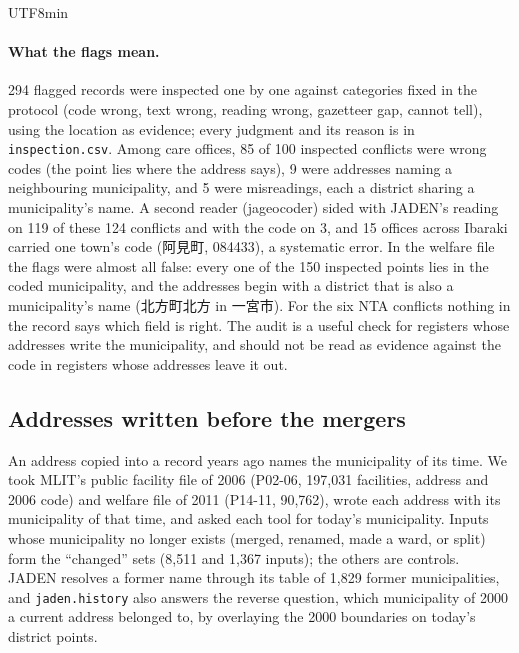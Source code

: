 \documentclass[10pt]{article}
\begin{document}
\begin{CJK}{UTF8}{min}
\paragraph{What the flags mean.} 294 flagged records were inspected one by one against categories fixed in
the protocol (code wrong, text wrong, reading wrong, gazetteer gap, cannot tell), using the location as
evidence; every judgment and its reason is in \texttt{inspection.csv}. Among care offices, 85 of 100
inspected conflicts were wrong codes (the point lies where the address says), 9 were addresses naming a
neighbouring municipality, and 5 were misreadings, each a district sharing a municipality's name. A
second reader (jageocoder) sided with JADEN's reading on 119 of these 124 conflicts and with the code on 3, and 15
offices across Ibaraki carried one town's code (阿見町, 084433), a systematic error. In the welfare
file the flags were almost all false: every one of the 150 inspected points lies in the coded
municipality, and the addresses begin with a district that is also a municipality's name
(北方町北方 in 一宮市). For the six NTA conflicts nothing in the record says which field is right.
The audit is a useful check for registers whose addresses write the municipality, and should not be read
as evidence against the code in registers whose addresses leave it out.

\subsection{Addresses written before the mergers}\label{sec:history}
An address copied into a record years ago names the municipality of its time. We took MLIT's public
facility file of 2006 (P02-06, 197,031 facilities, address and 2006 code) and welfare file of 2011 (P14-11,
90,762), wrote each address with its municipality of that time, and asked each tool for today's
municipality. Inputs whose municipality no longer exists (merged, renamed, made a ward, or split) form the
``changed'' sets (8,511 and 1,367 inputs); the others are controls. JADEN resolves a former name through
its table of 1,829 former municipalities, and \texttt{jaden.history} also answers the reverse question,
which municipality of 2000 a current address belonged to, by overlaying the 2000 boundaries on today's
district points.


\end{CJK}
\end{document}
